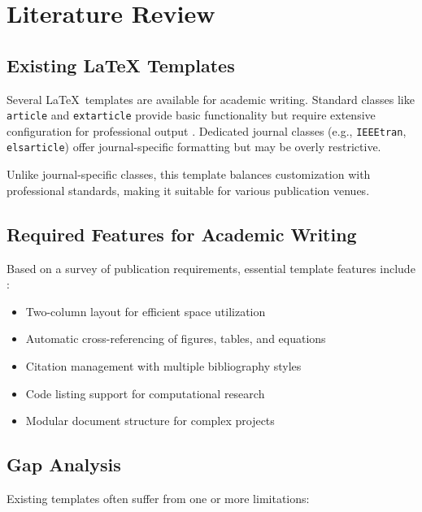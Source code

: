 \section{Literature Review}\label{sec:literature}

\subsection{Existing LaTeX Templates}

Several \LaTeX\ templates are available for academic writing. Standard classes like \texttt{article} and \texttt{extarticle} provide basic functionality but require extensive configuration for professional output \cite{latexcompanion}. Dedicated journal classes (e.g., \texttt{IEEEtran}, \texttt{elsarticle}) offer journal-specific formatting but may be overly restrictive.

\begin{note}
Unlike journal-specific classes, this template balances customization with professional standards, making it suitable for various publication venues.
\end{note}

\subsection{Required Features for Academic Writing}

Based on a survey of publication requirements, essential template features include \cite{academicwriting2023}:

\begin{itemize}
    \item Two-column layout for efficient space utilization
    \item Automatic cross-referencing of figures, tables, and equations
    \item Citation management with multiple bibliography styles
    \item Code listing support for computational research
    \item Modular document structure for complex projects
\end{itemize}

\subsection{Gap Analysis}

Existing templates often suffer from one or more limitations:

